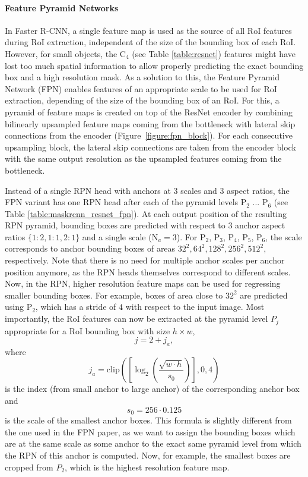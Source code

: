 \paragraph{Feature Pyramid Networks}
In Faster R-CNN, a single feature map is used as the source of all RoI features during RoI extraction, independent
of the size of the bounding box of each RoI.
However, for small objects, the C$_4$ (see Table \ref{table:resnet}) features
might have lost too much spatial information to allow properly predicting the exact bounding
box and a high resolution mask.
As a solution to this, the Feature Pyramid Network (FPN) \cite{FPN} enables features
of an appropriate scale to be used for RoI extraction, depending of the size of the bounding box of an RoI.
For this, a pyramid of feature maps is created on top of the ResNet \cite{ResNet}
encoder by combining bilinearly upsampled feature maps coming from the bottleneck
with lateral skip connections from the encoder (Figure~\ref{figure:fpn_block}).
For each consecutive upsampling block, the lateral skip connections are taken from
the encoder block with the same output resolution as the upsampled features coming
from the bottleneck.

Instead of a single RPN head with anchors at 3 scales and 3 aspect ratios,
the FPN variant has one RPN head after each of the pyramid levels P$_2$ ... P$_6$ (see Table \ref{table:maskrcnn_resnet_fpn}).
At each output position of the resulting RPN pyramid, bounding boxes are predicted
with respect to 3 anchor aspect ratios $\{1:2, 1:1, 2:1\}$ and a single scale ($\text{N}_a = 3$).
For P$_2$, P$_3$, P$_4$, P$_5$, P$_6$,
the scale corresponds to anchor bounding boxes of areas $32^2, 64^2, 128^2, 256^2, 512^2$,
respectively.
Note that there is no need for multiple anchor scales per anchor position anymore,
as the RPN heads themselves correspond to different scales.
Now, in the RPN, higher resolution feature maps can be used for regressing smaller
bounding boxes. For example, boxes of area close to $32^2$ are predicted using P$_2$,
which has a stride of $4$ with respect to the input image.
Most importantly, the RoI features can now be extracted at the pyramid level $P_j$ appropriate for a
RoI bounding box with size $h \times w$,
\begin{equation}
j = 2 + j_a,
\end{equation}
where
\begin{equation}
j_a = \mathrm{clip}\left(\left[\log_2\left(\frac{\sqrt{w \cdot h}}{s_0}\right)\right], 0, 4\right)
\label{eq:level_assignment}
\end{equation}
is the index (from small anchor to large anchor) of the corresponding anchor box and
\begin{equation}
s_0 = 256 \cdot 0.125
\label{eq:level_assignment}
\end{equation}
is the scale of the smallest anchor boxes.
This formula is slightly different from the one used in the FPN paper,
as we want to assign the bounding boxes which are at the same scale
as some anchor to the exact same pyramid level from which the RPN of this
anchor is computed. Now, for example, the smallest boxes are cropped from $P_2$,
which is the highest resolution feature map.

